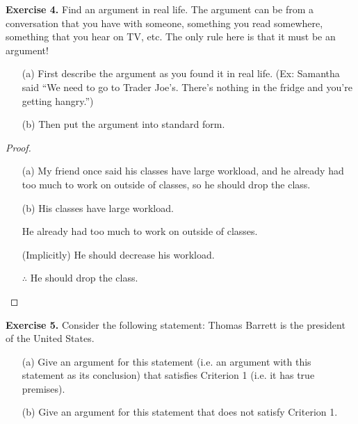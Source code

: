 \documentclass{article}
\begin{document}
\begin{ques}\label{q4}
\textbf{Exercise 4.} Find an argument in real life. The argument can be from a conversation that you have with someone, something you read somewhere, something that you hear on TV, etc. The only rule here is that it must be an argument!

\begin{enumerate}
\item[(a)] First describe the argument as you found it in real life. (Ex: Samantha said “We need to go to Trader Joe’s. There’s nothing in the fridge and you’re getting hangry.”)
\item[(b)] Then put the argument into standard form.
\end{enumerate}
\end{ques}

\begin{proof}
    \begin{itemize}
        \item[(a)] My friend once said his classes have large workload, and he already had too much to work on outside of classes, so he should drop the class.
        \item[(b)] His classes have large workload.
        
        He already had too much to work on outside of classes.

        (Implicitly) He should decrease his workload.

        $\therefore$ He should drop the class.
    \end{itemize}
\end{proof}

\hfil

\begin{ques}\label{q5}
\textbf{Exercise 5.} Consider the following statement: Thomas Barrett is the president of the United States.

\begin{enumerate}
\item[(a)] Give an argument for this statement (i.e. an argument with this statement as its conclusion) that satisfies Criterion 1 (i.e. it has true premises).
\item[(b)] Give an argument for this statement that does not satisfy Criterion 1.
\end{enumerate}
\end{ques}
\end{document}
